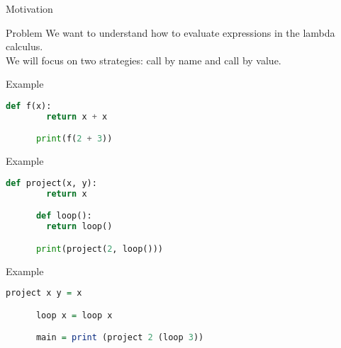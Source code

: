 \documentclass[10pt]{beamer}
\begin{document}
\begin{frame}[fragile]{Motivation}
  \begin{alertblock}{Problem}
    We want to understand how to evaluate expressions in the lambda calculus.\\
    We will focus on two strategies: call by name and call by value.\\
  \end{alertblock}

  \pause

  \begin{alertblock}{Example}

    \begin{lstlisting}[language=Python]
      def f(x):
        return x + x

      print(f(2 + 3))
    \end{lstlisting}



  \end{alertblock}

  \begin{alertblock}{Example }

    \begin{lstlisting}[language=Python]
      def project(x, y):
        return x

      def loop():
        return loop()

      print(project(2, loop()))
    \end{lstlisting}


  \end{alertblock}

  \begin{alertblock}{Example}

    \begin{lstlisting}[language=Haskell]
      project x y = x

      loop x = loop x

      main = print (project 2 (loop 3))
    \end{lstlisting}
  \end{alertblock}
\end{frame}


\end{document}
